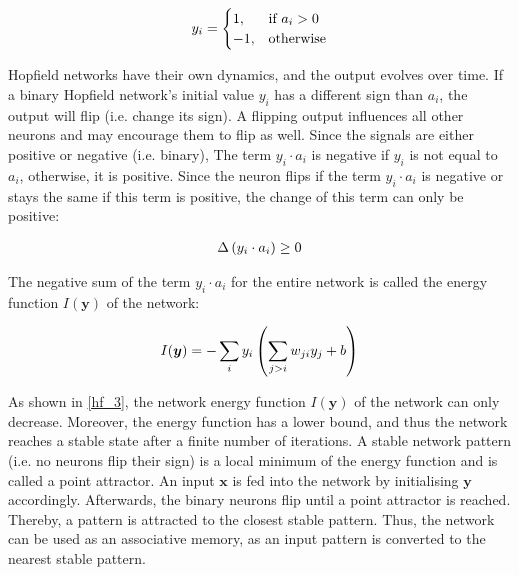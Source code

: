 \begin{align}\eqlbl{hf_2}
	y_i = \begin{cases}
      		1, & \text{if } a_i > 0 \\
      		-1, & \text{otherwise}
    	\end{cases}
\end{align}


Hopfield networks have their own dynamics, and the output evolves over time.
If a binary Hopfield network's initial value \(y_i\) has a different sign than $a_i$, the output will flip (i.e. change its sign).
A flipping output influences all other neurons and may encourage them to flip as well.
Since the signals are either positive or negative (i.e. binary), The term \(y_i \cdot a_i\) is negative if \(y_i\) is not equal to \(a_i\), otherwise, it is positive.
Since the neuron flips if the term \(y_i \cdot a_i\) is negative or stays the same if this term is positive, the change of this term can only be positive:

\begin{align}\eqlbl{hf_3}
	\Delta \left( y_i \cdot a_i \right) \geq 0
\end{align}

The negative sum of the term $y_i \cdot a_i$ for the entire network is called the energy function $I(\boldsymbol{y})$ of the network:

\begin{align}\eqlbl{hf_4}
	I(\boldsymbol{y}) = -\sum_{i} y_i \left( \sum_{j>i} w_{ji} y_j + b \right)
\end{align}

As shown in \eqref{hf_3}, the network energy function \(I(\boldsymbol{y})\) of the network can only decrease.
Moreover, the energy function has a lower bound, and thus the network reaches a stable state after a finite number of iterations. 
A stable network pattern (i.e. no neurons flip their sign) is a local minimum of the energy function and is called a point attractor.
An input $\boldsymbol{x}$ is fed into the network by initialising $\boldsymbol{y}$ accordingly.
Afterwards, the binary neurons flip until a point attractor is reached. Thereby, a pattern is attracted to the closest stable pattern.
Thus, the network can be used as an associative memory, as an input pattern is converted to the nearest stable pattern.

